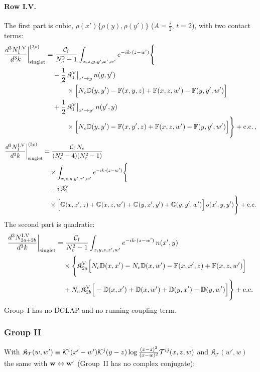 \paragraph{Row I.V.} The first part is cubic, $\rho(x')\{\rho(y),\rho(y')\}$ ($A=\frac{i}{2}$, $t=2$), with two contact terms:
\begin{align}\label{eq:sIV1}
\frac{d^3N^{\rm I.V}_1}{d^3k}\bigg|^{(2\rho)}_{\rm singlet}&=\frac{\mathcal C_{\rm f}}{N_c^2-1}\int_{x,z,y,y',x',w'}e^{-ik\cdot(z-w')}\Bigg\{\notag\\
&\quad-\frac12\,\mathfrak K^{\rm V}_1\big|_{x'\to y}\,n(y,y')\notag\\
&\qquad\quad\times\Big[N_c\mathbb{D}(y,y')-\mathbb{F}(x,y,z)+\mathbb{F}(x,z,w')-\mathbb{F}(y,y',w')\Big]\notag\\
&\quad+\frac12\,\mathfrak K^{\rm V}_1\big|_{x'\to y'}\,n(y',y)\notag\\
&\qquad\quad\times\Big[N_c\mathbb{D}(y,y')-\mathbb{F}(x,y',z)+\mathbb{F}(x,z,w')-\mathbb{F}(y,y',w')\Big]\Bigg\}+{\rm c.c.}\,,
\end{align}
\begin{align}\label{eq:oIV1}
\frac{d^3N^{\rm I.V}_1}{d^3k}\bigg|^{(3\rho)}_{\rm singlet}&=\frac{\mathcal C_{\rm f}\,N_c}{(N_c^2-4)(N_c^2-1)}\notag\\
&\quad\times\int_{x,z,y,y',x',w'}e^{-ik\cdot(z-w')}\Bigg\{\notag\\
&\quad-i\,\mathfrak K^{\rm V}_1\notag\\
&\quad\times\Big[\mathbb{G}(x,x',z)+\mathbb{G}(x,z,w')+\mathbb{G}(y,x',y')+\mathbb{G}(y,y',w')\Big]\,o(x',y,y')\Bigg\}+{\rm c.c.}
\end{align}
The second part is quadratic:
\begin{align}\label{eq:sIV2}
\frac{d^3N^{\rm I.V}_{2a+2b}}{d^3k}\bigg|_{\rm singlet}&=\frac{\mathcal C_{\rm f}}{N_c^2-1}\int_{x,y,z,x',w'}e^{-ik\cdot(z-w')}\,n(x',y)\notag\\
&\quad\times\Bigg\{\mathfrak K^{\rm V}_{2a}\Big[N_c\mathbb{D}(x,x')-N_c\mathbb{D}(x,w')-\mathbb{F}(x,x',z)+\mathbb{F}(x,z,w')\Big]\notag\\
&\quad+N_c\,\mathfrak K^{\rm V}_{2b}\Big[-\mathbb{D}(x,x')+\mathbb{D}(x,w')+\mathbb{D}(y,x')-\mathbb{D}(y,w')\Big]\Bigg\}+{\rm c.c.}
\end{align}
Group~I has no DGLAP and no running-coupling term.

\subsubsection*{Group II}
\noindent With $\mathfrak K_{\mathcal T}(w,w')\equiv\mathcal{K}^i(x'-w')\mathcal{K}^j(y-z)\log\frac{(x-z)^2}{(x-w)^2}\mathcal T^{ij}(x,z,w)$ and $\mathfrak K_{\mathcal T}(w',w)$ the same with $\mathbf{w}\leftrightarrow\mathbf{w}'$ (Group~II has no complex conjugate):


